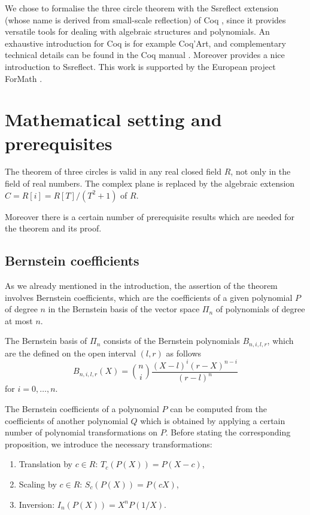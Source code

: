 \documentclass[11pt, a4paper]{article}
\begin{document}
We chose to formalise the three circle theorem with the Ssreflect extension \cite{ssreflect} (whose name is derived from small-scale reflection) of Coq \cite{coq}, since it provides versatile tools for dealing with algebraic structures and polynomials. An exhaustive introduction for Coq is for example Coq'Art, \cite{coqart} and complementary technical details can be found in the Coq manual \cite{CoqManualV84}. Moreover \cite{ssreflect-jfr} provides a nice introduction to Ssreflect. This work is supported  by the European project ForMath \cite{formath}.

\section{Mathematical setting and prerequisites}

The theorem of three circles is valid in any real closed field $R$, not only in the field of real numbers. The complex plane is replaced by the algebraic extension $C = R[i] = R[T]/(T^2+1)$ of $R$.

Moreover there is a certain number of prerequisite results which are needed for the theorem and its proof.  

\subsection{Bernstein coefficients}
\label{bernstein}

As we already mentioned in the introduction, the assertion of the theorem involves Bernstein coefficients, which are the coefficients of a given polynomial $P$ of degree $n$ in the Bernstein basis of the vector space $\Pi_n$ of polynomials of degree at most $n$. 

The Bernstein basis of $\Pi_n$ consists of the Bernstein polynomials $B_{n,i,l,r}$, which are the defined on the open interval $(l,r)$ as follows
\[B_{n,i,l,r}(X) =  {{n} \choose {i} }\frac{(X-l)^i (r-X)^{n-i}}{(r-l)^n} \]
for $i=0,\ldots,n$.

The Bernstein coefficients of a polynomial $P$ can be computed from the coefficients of another polynomial $Q$ which is obtained by applying a certain number of polynomial transformations on $P$. Before stating the corresponding proposition, we introduce the necessary transformations:

\begin{enumerate}
 \item Translation by $c \in R$: $T_c (P (X)) = P(X-c)$, 
 \item Scaling by $c \in R$: $S_c(P(X)) = P(cX)$,
 \item Inversion: $I_n(P(X)) = X^n P(1/X)$.
\end{enumerate}
\end{document}
